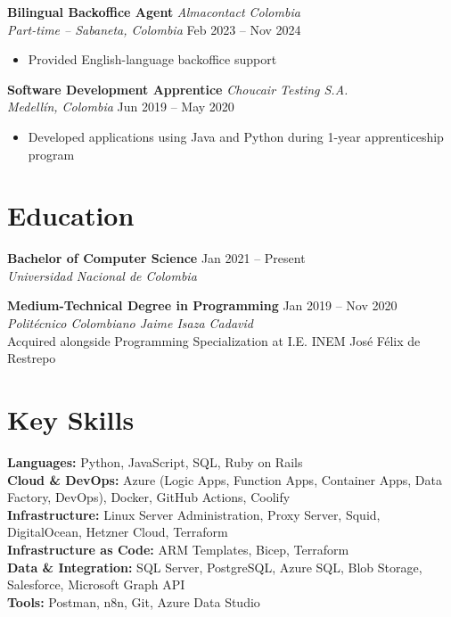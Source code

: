 \documentclass[11pt,a4paper]{article}
\newcommand{\experienceitem}[4]{%
    \needspace{5\baselineskip}
    \noindent
    \textbf{\color{darktext}#1} \hfill \textit{#2}\\
    \textit{\color{lighttext}#3} \hfill {\color{lighttext}#4}
    \vspace{4pt}
}
\newcommand{\educationitem}[4]{%
    \needspace{4\baselineskip}
    \begin{minipage}[t]{\textwidth}
    \noindent
    \textbf{\color{darktext}#1} \hfill {\color{lighttext}#2}\\
    \textit{#3}\\
    {\small #4}
    \vspace{6pt}
    \end{minipage}
}
\newcommand{\skillcategory}[2]{%
    \textbf{#1:} #2\\[3pt]
}
\begin{document}
\vspace{6pt}

\experienceitem
    {Bilingual Backoffice Agent}
    {Almacontact Colombia}
    {Part-time -- Sabaneta, Colombia}
    {Feb 2023 -- Nov 2024}

\begin{itemize}
    \item Provided English-language backoffice support
\end{itemize}

\vspace{6pt}

\experienceitem
    {Software Development Apprentice}
    {Choucair Testing S.A.}
    {Medell\'{i}n, Colombia}
    {Jun 2019 -- May 2020}

\begin{itemize}
    \item Developed applications using Java and Python during 1-year apprenticeship program
\end{itemize}

\section{Education}

\educationitem
    {Bachelor of Computer Science}
    {Jan 2021 -- Present}
    {Universidad Nacional de Colombia}
    {}

\educationitem
    {Medium-Technical Degree in Programming}
    {Jan 2019 -- Nov 2020}
    {Polit\'{e}cnico Colombiano Jaime Isaza Cadavid}
    {Acquired alongside Programming Specialization at I.E. INEM Jos\'{e} F\'{e}lix de Restrepo}

\section{Key Skills}

\skillcategory{Languages}{Python, JavaScript, SQL, Ruby on Rails}
\skillcategory{Cloud \& DevOps}{Azure (Logic Apps, Function Apps, Container Apps, Data Factory, DevOps), Docker, GitHub Actions, Coolify}
\skillcategory{Infrastructure}{Linux Server Administration, Proxy Server, Squid, DigitalOcean, Hetzner Cloud, Terraform}
\skillcategory{Infrastructure as Code}{ARM Templates, Bicep, Terraform}
\skillcategory{Data \& Integration}{SQL Server, PostgreSQL, Azure SQL, Blob Storage, Salesforce, Microsoft Graph API}
\skillcategory{Tools}{Postman, n8n, Git, Azure Data Studio}
\end{document}
